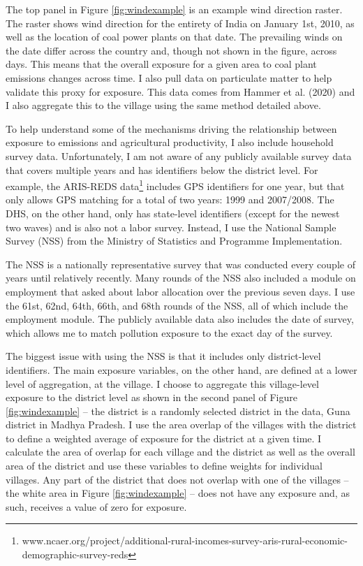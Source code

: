 \documentclass[
]{article}
\begin{document}
The top panel in Figure \ref{fig:windexample} is an example wind direction raster. The raster shows wind direction for the entirety of India on January 1st, 2010, as well as the location of coal power plants on that date. The prevailing winds on the date differ across the country and, though not shown in the figure, across days. This means that the overall exposure for a given area to coal plant emissions changes across time. I also pull data on particulate matter to help validate this proxy for exposure. This data comes from Hammer et al. (2020) and I also aggregate this to the village using the same method detailed above.

To help understand some of the mechanisms driving the relationship between exposure to emissions and agricultural productivity, I also include household survey data. Unfortunately, I am not aware of any publicly available survey data that covers multiple years and has identifiers below the district level. For example, the ARIS-REDS data\footnote{www.ncaer.org/project/additional-rural-incomes-survey-aris-rural-economic-demographic-survey-reds} includes GPS identifiers for one year, but that only allows GPS matching for a total of two years: 1999 and 2007/2008. The DHS, on the other hand, only has state-level identifiers (except for the newest two waves) and is also not a labor survey. Instead, I use the National Sample Survey (NSS) from the Ministry of Statistics and Programme Implementation.

The NSS is a nationally representative survey that was conducted every couple of years until relatively recently. Many rounds of the NSS also included a module on employment that asked about labor allocation over the previous seven days. I use the 61st, 62nd, 64th, 66th, and 68th rounds of the NSS, all of which include the employment module. The publicly available data also includes the date of survey, which allows me to match pollution exposure to the exact day of the survey.

The biggest issue with using the NSS is that it includes only district-level identifiers. The main exposure variables, on the other hand, are defined at a lower level of aggregation, at the village. I choose to aggregate this village-level exposure to the district level as shown in the second panel of Figure \ref{fig:windexample} -- the district is a randomly selected district in the data, Guna district in Madhya Pradesh. I use the area overlap of the villages with the district to define a weighted average of exposure for the district at a given time. I calculate the area of overlap for each village and the district as well as the overall area of the district and use these variables to define weights for individual villages. Any part of the district that does not overlap with one of the villages -- the white area in Figure \ref{fig:windexample} -- does not have any exposure and, as such, receives a value of zero for exposure.
\end{document}
